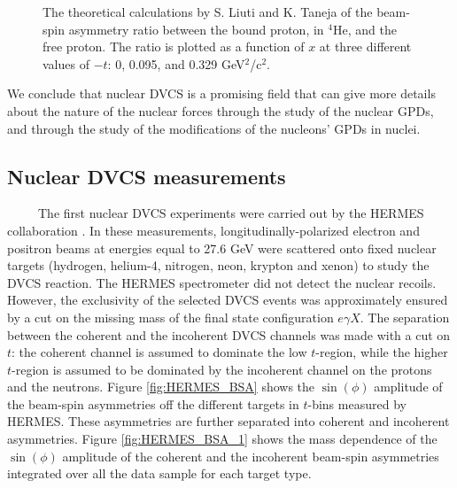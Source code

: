 \begin{figure}[tbp]
\begin{minipage}[c]{.46\linewidth}
\caption{The theoretical calculations by S. Liuti and K. Taneja \cite{EMC_simonetta} of the beam-spin asymmetry ratio between the bound proton, in $^4$He, and the free proton. The ratio is plotted as a function of $x$ at three different values of $-t$: 0, 0.095, and 0.329 GeV$^2$/c$^2$.}
\label{fig:EMC_Simonetta}
\vspace{+0.2in}
\end{minipage}
\end{figure}

We conclude that nuclear DVCS is a promising field that can give more details about the nature of the nuclear forces through the study of the nuclear GPDs, and through the study of the modifications of the nucleons' GPDs in nuclei.

\subsection{Nuclear DVCS measurements}
~~~~~The first nuclear DVCS experiments were carried out by the HERMES 
collaboration \cite{HERMES_BSA}. In these measurements, 
longitudinally-polarized electron and positron beams at energies equal to 27.6 
GeV were scattered onto fixed nuclear targets (hydrogen, helium-4, nitrogen, 
neon, krypton and xenon) to study the DVCS reaction. The HERMES spectrometer 
did not detect the nuclear recoils. However, the exclusivity of the selected 
DVCS events was approximately ensured by a cut on the missing mass of the final 
state configuration $e\gamma X$. The separation between the coherent and the 
incoherent DVCS channels was made with a cut on $t$: the coherent channel is 
assumed to dominate the low $t$-region, while the higher $t$-region is assumed 
to be dominated by the incoherent channel on the protons and the neutrons.  
Figure \ref{fig:HERMES_BSA} shows the $\sin(\phi)$ amplitude of the beam-spin 
asymmetries off the different targets in $t$-bins measured by HERMES.  These 
asymmetries are further separated into coherent and incoherent asymmetries.  
Figure \ref{fig:HERMES_BSA_1} shows the mass dependence of the $\sin(\phi)$ 
amplitude of the coherent and the incoherent beam-spin asymmetries integrated 
over all the data sample for each target type.\\

